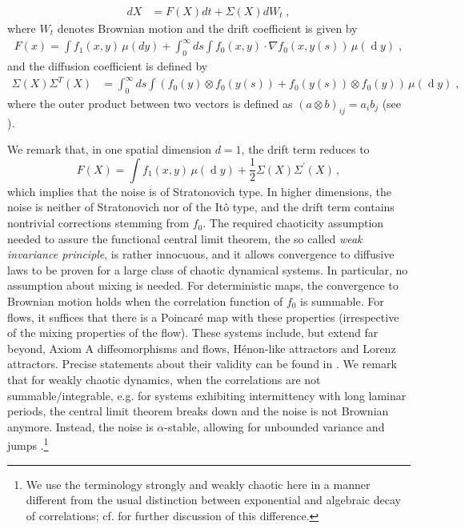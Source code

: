 \documentclass[12pt,onesided]{article}
\def\eps{\varepsilon}
\DeclareMathOperator{\diff}{d}
\newcommand{\difft}{d}
\begin{document}
\begin{align}
\difft X &= F(X) \difft t + \Sigma(X) \difft W_t \;,
\label{e.homog}
\end{align}
where $W_t$ denotes Brownian motion and the drift coefficient is given by
\begin{align}
F(x) = \int f_1(x,y)\,\mu(dy) 
+ \int_0^\infty \difft s \int f_0(x,y)\cdot \nabla f_0(x,y(s)) \,\mu(\diff y) \; ,
\label{e.F}
\end{align}
and the diffusion coefficient is defined by
\begin{align}
\Sigma(X) \Sigma^T(X) &=\int_0^\infty \difft s\int \left( f_0(y) \otimes f_0(y(s)) + f_0(y(s)) \otimes f_0(y) \right)\, \mu(\diff y) \; ,
\label{e.Sigma}
\end{align}
where the outer product between two vectors is defined as $(a\otimes b)_{ij} = a_{i}b_{j}$ (see \cite{PapanicolaouKohler74,IkedaWatanabe,KellyMelbourne17}). 

We remark that, in one spatial dimension $d=1$, the drift term reduces to 
\[
F(X)=\int f_1(x,y)\,\mu(\diff y) + \frac{1}{2} \Sigma(X)\Sigma^\prime(X)\, ,
\]
which implies that the noise is of Stratonovich type. In higher dimensions, the noise is neither of Stratonovich nor of the It\^o type, and the drift term contains nontrivial corrections stemming from $f_0$. The required chaoticity assumption needed to assure the functional central limit theorem, the so called {\em{weak invariance principle}}, 
is rather innocuous, and it allows convergence to diffusive laws to be proven for a large class of chaotic dynamical systems. In particular, no assumption about mixing is needed.  For deterministic maps, the convergence to Brownian motion holds when the correlation function of $f_0$ is summable. For flows, it suffices that there is a Poincar\'e map with these properties (irrespective of the mixing properties of the flow). These systems include, but extend far beyond, Axiom A diffeomorphisms and flows, H\'enon-like attractors and Lorenz attractors. Precise statements about their validity can be found in \cite{MelbourneNicol05,MelbourneNicol08,MelbourneNicol09}. We remark that for weakly chaotic dynamics, when the correlations are not summable/integrable, e.g. for systems exhibiting intermittency with long laminar periods, the central limit theorem breaks down and the noise is not Brownian anymore. Instead, the noise is $\alpha$-stable, allowing for unbounded variance and jumps \cite{GottwaldMelbourne13c}.\footnote{We use the terminology strongly and weakly chaotic here in a manner different from the usual distinction between exponential and algebraic decay of correlations; cf. \cite{GottwaldMelbourne13} for further discussion of this difference.}\\
\end{document}
